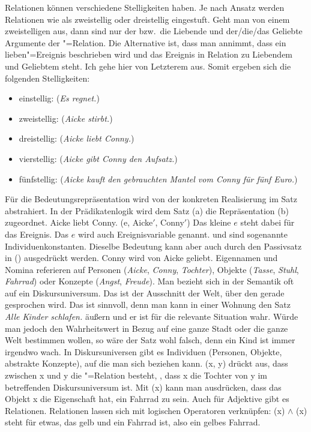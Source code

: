 Relationen können verschiedene Stelligkeiten haben. Je nach Ansatz werden Relationen wie
 als zweistellig oder dreistellig eingestuft. Geht man von einem zweistelligen
 aus, dann sind nur der bzw.\ die Liebende und der/die/das Geliebte Argumente der
"=Relation. Die Alternative ist, dass man annimmt, dass ein lieben"=Ereignis
beschrieben wird und das Ereignis in Relation zu Liebendem und Geliebtem steht. Ich gehe hier von
Letzterem aus. Somit ergeben sich die folgenden Stelligkeiten:
\begin{itemize}
\item einstellig:     (\emph{Es regnet.}) 
\item zweistellig:   (\emph{Aicke stirbt.})
\item dreistellig:    (\emph{Aicke liebt Conny.})
\item vierstellig:     (\emph{Aicke gibt Conny den Aufsatz.})
\item fünfstellig:    (\emph{Aicke kauft den gebrauchten Mantel vom Conny für fünf Euro.})
\end{itemize}
Für die Bedeutungsrepräsentation wird von der konkreten Realisierung im Satz abstrahiert. 
In der Prädikatenlogik wird \zb dem Satz (a) die Repräsentation (b) zugeordnet.
\eal
\ex Aicke liebt Conny.
\ex {}(e, Aicke$'$, Conny$'$)
\zl
Das kleine $e$ steht dabei für das Ereignis. Das $e$ wird auch Ereignisvariable
genannt.  und  sind sogenannte Individuenkonstanten. Dieselbe Bedeutung kann aber auch durch den Passivsatz in () ausgedrückt werden.
\ea
Conny wird von Aicke geliebt.
\z
Eigennamen und Nomina referieren auf Personen (\emph{Aicke}, \emph{Conny}, \emph{Tochter}), Objekte (\emph{Tasse},
\emph{Stuhl}, \emph{Fahrrad}) oder Konzepte (\emph{Angst}, \emph{Freude}). Man bezieht sich in der
Semantik oft auf ein Diskursuniversum. Das ist der Ausschnitt der Welt, über den gerade
gesprochen wird. Das ist sinnvoll, denn man kann in einer Wohnung den Satz \emph{Alle Kinder
  schlafen.} äußern und er ist für die relevante Situation wahr. Würde man jedoch den Wahrheitswert
in Bezug auf eine ganze Stadt oder die ganze Welt bestimmen wollen, so wäre der Satz wohl falsch,
denn ein Kind ist immer irgendwo wach.
In Diskursuniversen gibt es Individuen (Personen, Objekte, abstrakte Konzepte), auf
die man sich beziehen kann. (x, y) drückt aus, dass zwischen x und y die
"=Relation besteht, \dash, dass x die Tochter von y im betreffenden
Diskursuniversum ist. Mit (x) kann man ausdrücken, dass das Objekt x die
Eigenschaft hat, ein Fahrrad zu sein. Auch für Adjektive gibt es Relationen. Relationen lassen sich
mit logischen Operatoren verknüpfen: (x) $\wedge$ (x) steht für
etwas, das gelb und ein Fahrrad ist, also ein gelbes Fahrrad.

